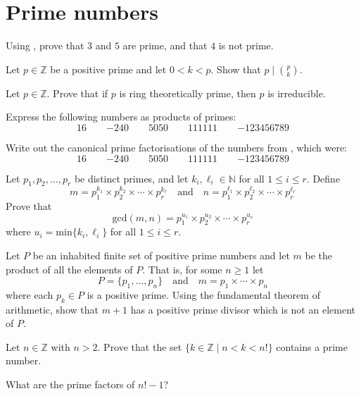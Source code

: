 \section{Prime numbers}


\begin{exercise}
Using , prove that $3$ and $5$ are prime, and that $4$ is not prime.
\end{exercise}



\begin{exercise}
Let $p \in \mathbb{Z}$ be a positive prime and let $0 < k < p$. Show that $p \mid \binom{p}{k}$.
\end{exercise}


\begin{exercise}
Let $p \in \mathbb{Z}$. Prove that if $p$ is ring theoretically prime, then $p$ is irreducible.
\end{exercise}


\begin{exercise}
\label{exNumbersAsProductsOfPrimes}
Express the following numbers as products of primes:
\[ 16 \qquad {-240} \qquad 5050 \qquad 111111 \qquad {-123456789} \]
\end{exercise}


\begin{exercise}
Write out the canonical prime factorisations of the numbers from , which were:
\[ 16 \qquad {-240} \qquad 5050 \qquad 111111 \qquad {-123456789} \]
\end{exercise}


\begin{exercise}
\label{exGCDfromFTA}
Let $p_1,p_2,\dots,p_r$ be distinct primes, and let $k_i,\ell_i \in \mathbb{N}$ for all $1 \le i \le r$. Define
\[ m = p_1^{k_1} \times p_2^{k_2} \times \cdots \times p_r^{k_r} \quad \text{and} \quad n = p_1^{\ell_1} \times p_2^{\ell_2} \times \cdots \times p_r^{\ell_r} \]
Prove that
\[ \mathrm{gcd}(m,n) = p_1^{u_1} \times p_2^{u_2} \times \cdots \times p_r^{u_r} \]
where $u_i = \mathrm{min} \{ k_i, \ell_i \}$ for all $1 \le i \le r$.
\end{exercise}


\begin{exercise}
\label{exConstructPrimeNotInList}
Let $P$ be an inhabited finite set of positive prime numbers and let $m$ be the product of all the elements of $P$. That is, for some $n \ge 1$ let
\[ P = \{ p_1, \dots, p_n \} \quad \text{and} \quad m = p_1 \times \cdots \times p_n \]
where each $p_k \in P$ is a positive prime. Using the fundamental theorem of arithmetic, show that $m+1$ has a positive prime divisor which is not an element of $P$.
\end{exercise}


\begin{exercise}
\label{exPrimesUsingFactorials}
Let $n \in \mathbb{Z}$ with $n>2$. Prove that the set $\{ k \in \mathbb{Z} \mid n<k<n! \}$ contains a prime number.
\begin{backhint}
What are the prime factors of $n!-1$?
\end{backhint}
\end{exercise}
